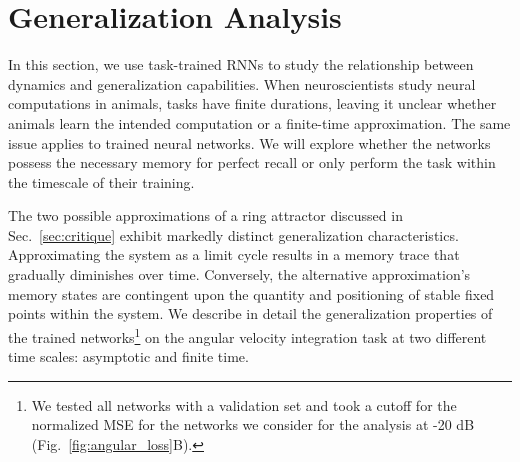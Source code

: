 \documentclass{article} %
\newcounter{ct}
\theoremstyle{definition}
\theoremstyle{remark}
\begin{document}
\section{Generalization Analysis}\label{sec:generalization}

In this section, we use task-trained RNNs to study the relationship between dynamics and generalization capabilities.
 When neuroscientists study neural computations in animals, tasks have finite durations, leaving it unclear whether animals learn the intended computation or a finite-time approximation.
  The same issue applies to trained neural networks.
   We will explore whether the networks possess the necessary memory for perfect recall or only perform the task within the timescale of their training.


The two possible approximations of a ring attractor discussed in Sec.~\ref{sec:critique} exhibit markedly distinct generalization characteristics.
Approximating the system as a limit cycle results in a memory trace that gradually diminishes over time.
Conversely, the alternative approximation's memory states are contingent upon the quantity and positioning of stable fixed points within the system.
We describe in detail the generalization properties of the trained networks\footnote{We tested all networks with a validation set and took a cutoff for the normalized MSE for the networks we consider for the analysis at -20 dB (Fig.~\ref{fig:angular_loss}B).} 
on the angular velocity integration task at two different time scales:  asymptotic and finite time.
\end{document}

